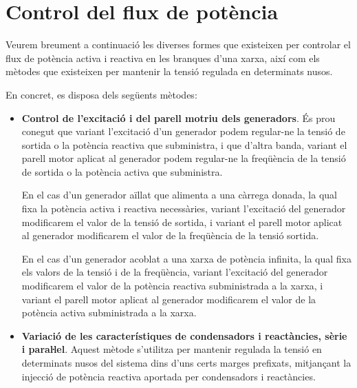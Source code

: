 \section{Control del flux de potència} \label{sec:control-flux-pot}

Veurem breument a continuació les diverses formes que existeixen
per controlar el flux de potència activa i reactiva en les branques
d'una xarxa, així com els mètodes que existeixen per mantenir la
tensió regulada en determinats nusos.

En concret, es disposa dels següents mètodes:

\begin{itemize}
 \item \textbf{Control de l'excitació i del parell motriu dels generadors}. És prou conegut
    que variant l'excitació d'un generador podem regular-ne la tensió de sortida o
        la potència reactiva que subministra, i que d'altra banda, variant el parell motor aplicat al generador
    podem regular-ne la freqüència de la  tensió de sortida o la potència activa que subministra.

    En el cas d'un generador aïllat que alimenta a una càrrega
    donada, la qual fixa la potència activa i reactiva necessàries, variant
     l'excitació del generador modificarem el valor de la tensió de sortida, i variant el parell motor aplicat al generador modificarem el valor de la freqüència de la tensió sortida.

     En el cas d'un generador acoblat a una xarxa de potència
    infinita, la qual fixa els valors de la tensió i de la freqüència, variant l'excitació del generador modificarem el valor de la potència reactiva subministrada a la xarxa, i variant el parell motor aplicat al     generador modificarem el valor de la potència
    activa  subministrada a la xarxa.

   \item \textbf{Variació de les característiques de condensadors i reactàncies, sèrie
    i paraŀlel}. Aquest mètode s'utilitza per mantenir regulada la tensió en determinats
     nusos del sistema dins d'uns certs marges prefixats, mitjançant la injecció  de potència
      reactiva aportada per condensadors i reactàncies.


\end{itemize}
